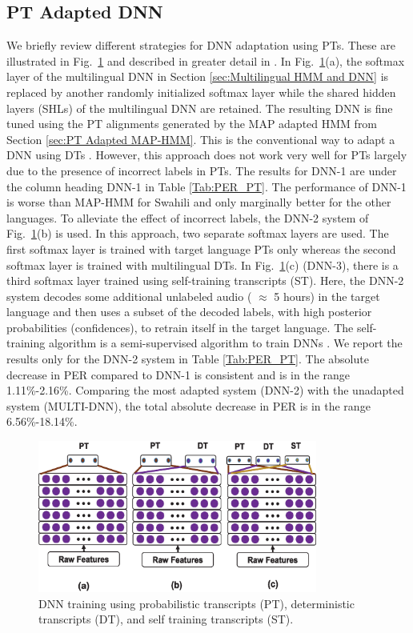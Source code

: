 \documentclass[a4paper]{article}
\newcommand{\myvspacefig}{\vspace{-4mm}}
\begin{document}
\subsection{PT Adapted DNN} \vspace{-1mm}
\label{sec:PT Adapted DNN}
We briefly review different strategies for DNN adaptation using PTs. These are illustrated in Fig.~\ref{fig:DNN} and described in greater detail in \cite{Das-PTAdaptedDNN}. In Fig.~\ref{fig:DNN}(a), the softmax layer of the multilingual DNN in Section \ref{sec:Multilingual HMM and DNN} is replaced by another randomly initialized softmax layer while the shared hidden layers (SHLs) of the multilingual DNN are retained. The resulting DNN is fine tuned using the PT alignments generated by the MAP adapted HMM from Section \ref{sec:PT Adapted MAP-HMM}. This is the conventional way to adapt a DNN using DTs \cite{Ghoshal-MultilingualPretraining}. However, this approach does not work very well for PTs largely due to the presence of incorrect labels in PTs. The results for DNN-1 are under the column heading DNN-1 in Table \ref{Tab:PER_PT}. The performance of DNN-1 is worse than MAP-HMM for Swahili and only marginally better for the other languages. To alleviate the effect of incorrect labels, the DNN-2 system of Fig.~\ref{fig:DNN}(b) is used. In this approach, two separate softmax layers are used. The first softmax layer is trained with target language PTs only whereas the second softmax layer is trained with multilingual DTs. In Fig.~\ref{fig:DNN}(c) (DNN-3), there is a third softmax layer trained using self-training transcripts (ST). Here, the DNN-2 system decodes some additional unlabeled audio ( $\approx$ 5 hours) in the target language and then uses a subset of the decoded labels, with high posterior probabilities (confidences), to retrain itself in the target language. The self-training algorithm is a semi-supervised algorithm to train DNNs \cite{Vesely-SemisupTrainingDNN}. We report the results only for the DNN-2 system in Table \ref{Tab:PER_PT}. The absolute decrease in PER compared to DNN-1 is consistent and is in the range 1.11\%-2.16\%. Comparing the most adapted system (DNN-2) with the unadapted system (MULTI-DNN), the total absolute decrease in PER is in the range 6.56\%-18.14\%.

\begin{figure}
 \centering
 \includegraphics[width=\linewidth,height=5cm]{fig/DNN_multisoftmax.eps}
 \myvspacefig
 \myvspacefig
  \caption{DNN training using probabilistic transcripts (PT), deterministic transcripts (DT), and self training transcripts (ST).}
 \label{fig:DNN}
\end{figure}
\end{document}
